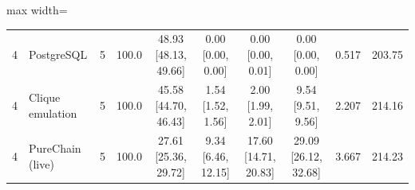\begin{table}[t]
\begin{adjustbox}{max width=\textwidth}
\begin{tabular}{llrrcccccr}
4 & PostgreSQL & 5 & 100.0 & 48.93 [48.13, 49.66] & 0.00 [0.00, 0.00] & 0.00 [0.00, 0.01] & 0.00 [0.00, 0.00] & 0.517 & 203.75 \\
4 & Clique emulation & 5 & 100.0 & 45.58 [44.70, 46.43] & 1.54 [1.52, 1.56] & 2.00 [1.99, 2.01] & 9.54 [9.51, 9.56] & 2.207 & 214.16 \\
4 & PureChain (live) & 5 & 100.0 & 27.61 [25.36, 29.72] & 9.34 [6.46, 12.15] & 17.60 [14.71, 20.83] & 29.09 [26.12, 32.68] & 3.667 & 214.23 \\
\bottomrule
\end{tabular}\end{adjustbox}
\end{table}
